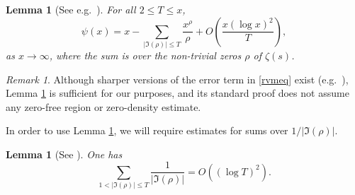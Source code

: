 \documentclass[reqno]{amsart}
\newtheorem{lemma}[theorem]{Lemma}
\numberwithin{equation}{section}
\theoremstyle{remark}
\newtheorem*{remark}{Remark}
\begin{document}
\begin{lemma}[{See e.g.\ \cite[Theorem 12.5]{montgomery2006multiplicative}}]\label{RVMlem}
    For all $2\leq T\leq x$,
    \begin{equation}\label{rvmeq}
        \psi(x)=x-\sum_{|\Im(\rho)|\leq T} \frac{x^{\rho}}{\rho}+O\left(\frac{x(\log x)^2}{T}\right),
    \end{equation}
    as $x\to\infty$, where the sum is over the non-trivial zeros $\rho$ of $\zeta(s)$.
\end{lemma}
\begin{remark}
    Although sharper versions of the error term in \eqref{rvmeq} exist (e.g.\ \cite{Goldston_83, cully2023error,johnston2024error}), Lemma \ref{RVMlem} is sufficient for our purposes, and its standard proof does not assume any zero-free region or zero-density estimate.
\end{remark}

In order to use Lemma \ref{RVMlem}, we will require estimates for sums over $1/|\Im(\rho)|$.
\begin{lemma}[{See \cite[Theorem 25b]{ingham1932distribution}}]\label{Implem1}
    One has
    \begin{equation*}
        \sum_{1<|\Im(\rho)|\leq T}\frac{1}{|\Im(\rho)|}=O\left((\log T)^2\right).
    \end{equation*}
\end{lemma}
\end{document}
